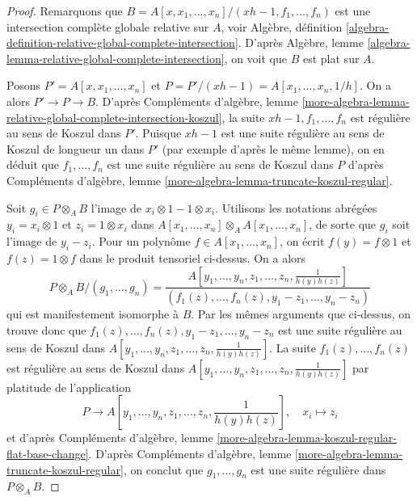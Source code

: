 \begin{proof}
Remarquons que
$B = A[x, x_1, \ldots, x_n]/(xh - 1, f_1, \ldots, f_n)$
est une intersection complète globale relative sur $A$, voir
Algèbre, définition
\ref{algebra-definition-relative-global-complete-intersection}.
D'après Algèbre, lemme \ref{algebra-lemma-relative-global-complete-intersection},
on voit que $B$ est plat sur $A$.

\medskip\noindent
Posons $P' = A[x, x_1, \ldots, x_n]$ et
$P = P'/(xh - 1) = A[x_1, \ldots, x_n, 1/h]$.
On a alors $P' \to P \to B$.
D'après Compléments d'algèbre, lemme
\ref{more-algebra-lemma-relative-global-complete-intersection-koszul},
la suite $xh - 1, f_1, \ldots, f_n$ est régulière au sens de Koszul
dans $P'$. Puisque $xh - 1$ est une suite régulière au sens de Koszul de longueur
un dans $P'$ (par exemple d'après le même lemme), on en déduit que
$f_1, \ldots, f_n$ est une suite régulière au sens de Koszul dans $P$ d'après
Compléments d'algèbre, lemme \ref{more-algebra-lemma-truncate-koszul-regular}.

\medskip\noindent
Soit $g_i \in P \otimes_A B$ l'image de $x_i \otimes 1 - 1 \otimes x_i$.
Utilisons les notations abrégées $y_i = x_i \otimes 1$ et $z_i = 1 \otimes x_i$
dans $A[x_1, \ldots, x_n] \otimes_A A[x_1, \ldots, x_n]$,
de sorte que $g_i$ soit l'image de $y_i - z_i$. Pour un polynôme
$f \in A[x_1, \ldots, x_n]$, on écrit $f(y) = f \otimes 1$
et $f(z) = 1 \otimes f$ dans le produit tensoriel ci-dessus.
On a alors
$$
P \otimes_A B/(g_1, \ldots, g_n) =
\frac{A[y_1, \ldots, y_n, z_1, \ldots, z_n, \frac{1}{h(y)h(z)}]}
{(f_1(z), \ldots, f_n(z), y_1 - z_1, \ldots, y_n - z_n)}
$$
qui est manifestement isomorphe à $B$. Par les mêmes arguments
que ci-dessus, on trouve donc que $f_1(z), \ldots, f_n(z), y_1 - z_1, \ldots, y_n - z_n$
est une suite régulière au sens de Koszul dans
$A[y_1, \ldots, y_n, z_1, \ldots, z_n, \frac{1}{h(y)h(z)}]$.
La suite $f_1(z), \ldots, f_n(z)$ est régulière au sens de Koszul dans
$A[y_1, \ldots, y_n, z_1, \ldots, z_n, \frac{1}{h(y)h(z)}]$
par platitude de l'application
$$
P \longrightarrow A[y_1, \ldots, y_n, z_1, \ldots, z_n,
\textstyle{\frac{1}{h(y)h(z)}}],\quad x_i \longmapsto z_i
$$
et d'après Compléments d'algèbre, lemme
\ref{more-algebra-lemma-koszul-regular-flat-base-change}.
D'après Compléments d'algèbre, lemme \ref{more-algebra-lemma-truncate-koszul-regular},
on conclut que $g_1, \ldots, g_n$ est une suite régulière
dans $P \otimes_A B$.


\end{proof}
